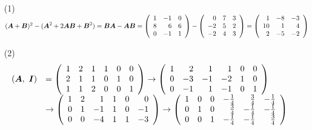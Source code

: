 \begin{frame}
\begin{jie}
\begin{itemize}
\item[(1)]  $(\boldsymbol{A}+\boldsymbol{B})^2-(\boldsymbol{A}^2+2\boldsymbol{A}\boldsymbol{B}+\boldsymbol{B}^2)=\boldsymbol{B}\boldsymbol{A}-\boldsymbol{A}\boldsymbol{B}=\left(
\begin{array}{rrr}
1&-1&0\\
8&6&6\\
0&-1&1
\end{array}
\right)-\left(
\begin{array}{rrr}
0&7&3\\
-2&5&2\\
-2&4&3
\end{array}
\right)=\left(
\begin{array}{rrr}
1&-8&-3\\
10&1&4\\
2&-5&-2
\end{array}
\right)$ \pause 
\item[(2)]
$$
\begin{array}{rl}
(\boldsymbol{A},~\boldsymbol{I})&=\left(
\begin{array}{rrrrrr}
1&2&1&1&0&0\\
2&1&1&0&1&0\\
1&1&2&0&0&1
\end{array}
\right)\rightarrow\left(
\begin{array}{rrrrrr}
1&2&1&1&0&0\\
0&-3&-1&-2&1&0\\
0&-1&1&-1&0&1
\end{array}
\right)\\
&\rightarrow\left(
\begin{array}{rrrrrr}
1&2&1&1&0&0\\
0&1&-1&1&0&-1\\
0&0&-4&1&1&-3\\
\end{array}
\right)\rightarrow\left(
\begin{array}{rrrrrr}
1&0&0&-\frac14&\frac34&-\frac14\\
0&1&0&\frac34&-\frac14&-\frac14\\
0&0&1&-\frac14&-\frac14&\frac34\\
\end{array}
\right)
\end{array}
$$
\end{itemize}
\end{jie}
\end{frame}

